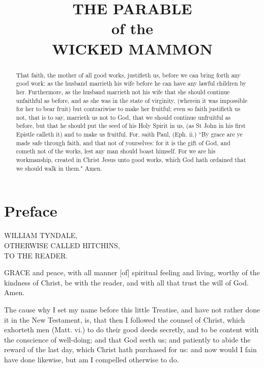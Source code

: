 \documentclass{custom}
\begin{document}
\title{THE PARABLE\\
of the\\
WICKED MAMMON}
\author{}
\date{}
\maketitle

\begin{abstract}
That faith, the mother of all good works, justifieth us, before we can bring 
forth any good work: as the husband marrieth his wife before he can have 
any lawful children by her. Furthermore, as the husband marrieth not 
his wife that she should continue unfaithful as before, and as she was in 
the state of virginity, (wherein it was impossible for her to bear fruit) but 
contrariwise to make her fruitful; even so faith justifieth us not, that is to 
say, marrieth us not to God, that we should continue unfruitful as before, 
but that he should put the seed of his Holy Spirit in us, (as St John in his 
first Epistle calleth it) and to make us fruitful. For, saith Paul, (Eph. ii.) 
``By grace are ye made safe through faith, and that not of yourselves: for 
it is the gift of God, and cometh not of the works, lest any man should 
boast himself. For we are his workmanship, created in Christ Jesus unto 
good works, which God hath ordained that we should walk in them." Amen. 
\end{abstract}


\section*{Preface}
\begin{center}
WILLIAM TYNDALE,\\
OTHERWISE CALLED HITCHINS,\\
TO THE READER. 
\end{center}



GRACE and peace, with all manner [of]
spiritual feeling and living, worthy of the
kindness of Christ, be with the reader, and with 
all that trust the will of God. Amen. 

The cause why I set my name before this
little Treatise, and have not rather done it in
the New Testament, is, that then I followed
the counsel of Christ, which exhorteth men
(Matt. vi.) to do their good deeds secretly, and
to be content with the conscience of well-doing; 
and that God seeth us; and patiently to abide 
the reward of the last day, which Christ hath 
purchased for us: and now would I fain have 
done likewise, but am I compelled otherwise 
to do. 
\end{document}
